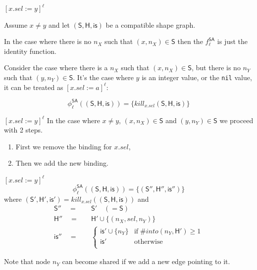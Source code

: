 \documentclass[xcolor=svgnames,11pt]{beamer}
\begin{document}
\begin{frame}{$[x.sel:=y]^\ell$}

Assume $x \neq y$ and let $\mathsf{(S,H,is)}$ be a compatible shape graph.

\medskip
\pause

In the case where there is no $n_X$ such that $(x, n_X) \in \mathsf{S}$ then the $f_\ell^{\textsf{SA}}$ is just the identity function.

\medskip
\pause

Consider the case where there is a $n_X$ such that $(x, n_{X}) \in \mathsf{S}$, but there is no $n_Y$ such that $(y, n_{Y}) \in \mathsf{S}$. It's the case where $y$ is an integer value, or the \texttt{nil} value, it can be treated as $[x.sel:=a]^\ell$:

$${\phi}_\ell^{\mathsf{SA}}\mathsf{((S,H,is))} = \{ kill_{x.sel} \mathsf{ (S,H,is) } \} $$

\end{frame}

\begin{frame}{$[x.sel:=y]^\ell$}
In the case where $x \neq y$, $(x, n_X) \in \mathsf{S}$ and $(y, n_Y) \in \mathsf{S}$ we proceed with 2 steps.
\pause
\medskip
\begin{enumerate}
\item First we remove the binding for $x.sel$,
\item Then we add the new binding.
\end{enumerate}
\end{frame}

\begin{frame}{$[x.sel:=y]^\ell$}
$${\phi}_\ell^{\mathsf{SA}}\mathsf{((S,H,is))} = \{ \mathsf{ (S'',H'',is'') } \} $$
\medskip
where $\mathsf{ (S',H',is') } = kill_{x.sel}(\mathsf{ (S,H,is) })$ and
\pause
\begin{align*}
\mathsf{S''} \quad=&\quad \mathsf{S'} \quad (=\mathsf{S}) \\
\mathsf{H''} \quad=&\quad \mathsf{H'} \cup \{(n_X, sel, n_Y)\} \\
\mathsf{is''} \quad=&\quad \left\{
\begin{array}{ll}
\mathsf{is'} \cup \{n_Y\} & \mathrm{if}\; \#into(n_Y,\mathsf{H'}) \geq 1 \\
\mathsf{is'} & \mathrm{otherwise} \\
\end{array}
\right.
\end{align*} 

Note that node $n_Y$ can become shared if we add a new edge pointing to it.

\end{frame}
\end{document}
